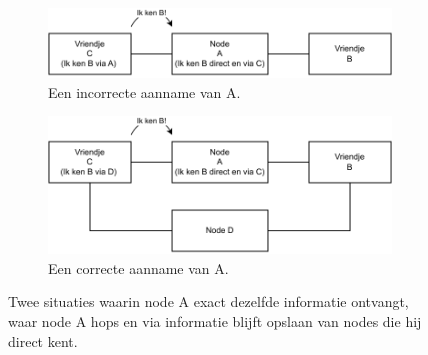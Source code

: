\begin{figure}[ht]
    \centering
    \begin{subfigure}[][4cm][t]{0.8\textwidth}
        \centering
        \includegraphics[scale=1]{img/incorrectAssumption.pdf}
        \caption{Een incorrecte aanname van A.}
        \label{fig:incorrectAssumption}
    \end{subfigure}
    \hfill
    \begin{subfigure}{0.8\textwidth}
        \centering
        \includegraphics[scale=1]{img/correctAssumption.pdf}
        \caption{Een correcte aanname van A.}
        \label{fig:correctAssumption}
    \end{subfigure}
    \caption{Twee situaties waarin node A exact dezelfde informatie ontvangt, waar node A hops en via informatie blijft opslaan van nodes die hij direct kent.}
    \label{fig:HopsOpslaanVanActieveNode}
\end{figure}